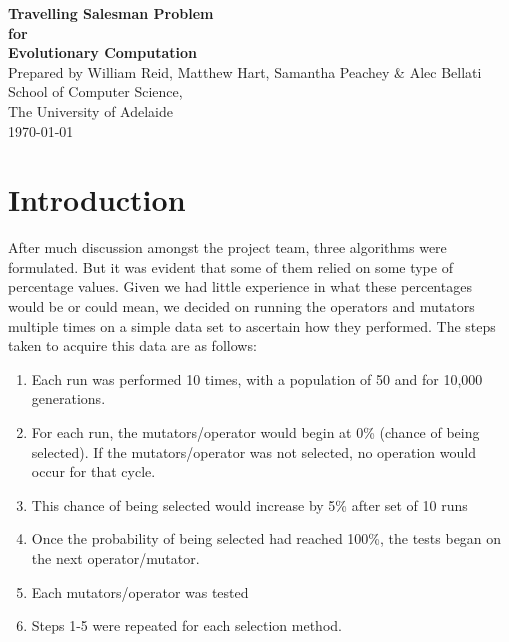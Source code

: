 \documentclass[a4paper,12pt]{article}
\begin{document}
\begin{titlepage}
\begin{center}
\vspace*{3cm}
{\LARGE\bf Travelling Salesman Problem}\\
\vspace{1.5cm}
{\large\bf for}\\
\vspace{1.5cm}
{\LARGE\bf Evolutionary Computation}\\
\vspace{5cm}
Prepared by William Reid, Matthew Hart, Samantha Peachey \& Alec Bellati\\
\vspace{1cm}
School of Computer Science,\\
The University of Adelaide\\
\vspace{1cm}
\today
\end{center}
\end{titlepage}


\section{Introduction}

After much discussion amongst the project team, three algorithms were formulated. But it was evident that some of them relied on some type of percentage values. Given we had little experience in what these percentages would be or could mean, we decided on running the operators and mutators multiple times on a simple data set to ascertain how they performed. The steps taken to acquire this data are as follows:
\begin{enumerate}
\item Each run was performed 10 times, with a population of 50 and for 10,000 generations.
\item For each run, the mutators/operator would begin at 0\% (chance of being selected). If the mutators/operator was not selected, no operation would occur for that cycle.
\item This chance of being selected would increase by 5\% after set of 10 runs
\item Once the probability of being selected had reached 100\%, the tests began on the next operator/mutator.
\item Each mutators/operator was tested
\item Steps 1-5 were repeated for each selection method.
\end{enumerate}
\end{document}
